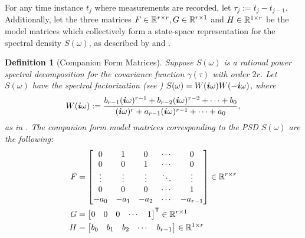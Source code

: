 \documentclass[10pt]{article}
\newtheorem{definition}{Definition}[section]
\numberwithin{equation}{section}
\begin{document}
For any time instance $t_{j}$ where measurements are recorded, let $\tau_{j} := t_{j} - t_{j-1}$. Additionally, let the three matrices $F \in \mathbb{R}^{r \times r}, G \in \mathbb{R}^{r \times 1}$ and $H \in \mathbb{R}^{1 \times r}$ be the model matrices which collectively form a state-space representation for the spectral density $S(\omega)$, as described by \citeauthor{Carron-ML-Kalman-2016} and .
\begin{definition}[Companion Form Matrices]
\label{def:companion-matrices}
    Suppose $S(\omega)$ is a rational power spectral decomposition for the covariance function $\gamma(\tau)$ with order $2r$. Let $S(\omega)$ have the spectral factorization (see ) $S(\omega) = W(\bm{i}\omega)W(-\bm{i}\omega)$, where 
    \begin{equation}
        W(\bm{i}\omega) := \frac{b_{r-1}(\bm{i}\omega)^{r-1} + b_{r-2}(\bm{i}\omega)^{r-2} + \cdots + b_{0}}{(\bm{i}\omega)^{r} + a_{r-1}(\bm{i}\omega)^{r-1} + \cdots + a_{0}},
    \end{equation}
    as in . The companion form model matrices corresponding to the PSD $S(\omega)$ are the following:
    \begin{subequations}
        \label{eq:companion-model-matrices}
        \begin{align}
            F &= \begin{bmatrix}
                0 & 1 & 0 & \cdots & 0\\
                0 & 0 & 1 & \cdots & 0\\
                \vdots & \vdots & \vdots & \ddots & \vdots\\
                0 & 0 & 0 & \cdots & 1\\
                -a_{0} & -a_{1} & -a_{2} & \cdots & -a_{r-1}
            \end{bmatrix} \in \mathbb{R}^{r \times r} \label{eq:companion-model-matrix-F}\\
            G &= \begin{bmatrix}
                0 & 0 & 0 & \cdots & 1
            \end{bmatrix}^{\mathsf{T}} \in \mathbb{R}^{r \times 1} \label{eq:companion-model-matrix-G}\\
            H &= \begin{bmatrix}
                b_0 & b_{1} & b_{2} & \cdots & b_{r-1}
            \end{bmatrix} \in \mathbb{R}^{1 \times r} \label{eq:companion-model-matrix-H}
        \end{align}
    \end{subequations}
\end{definition}
\end{document}
